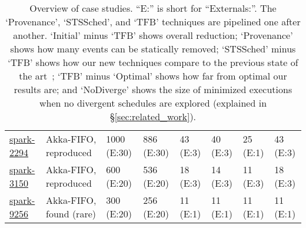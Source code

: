 \begin{table*}
{\begin{tabular}{|l|l|l|l|l|l||l||l|}
\href{https://docs.google.com/document/d/1JQiaLlm6XwLCWKOBOFkaMzg8Gd7NT5gDH3_8OV-oekY}{spark-2294}
& Akka-FIFO, reproduced
& 1000 \hfill (E:30) & 886 \hfill (E:30) & 43 \hfill (E:3) & 40 \hfill (E:3) &
25 \hfill (E:1) & 43 \hfill (E:3) \\


\href{https://docs.google.com/document/d/1mWbxS2-B0v4fbY_FIASs6HCmAXFh6K89DMYX-XEmeL8}{spark-3150}
& Akka-FIFO, reproduced
& 600 \hfill (E:20) & 536 \hfill (E:20) & 18 \hfill (E:3) & 14 \hfill (E:3) &
11 \hfill (E:3) & 18 \hfill (E:3) \\

\href{https://docs.google.com/document/d/1rPseAbo3FELT8Fj2lrRUMkrDmjLPYI26Jgr8goAMLzU}{spark-9256}
& Akka-FIFO, found (rare)
& 300 \hfill (E:20) & 256 \hfill (E:20) & 11 \hfill (E:1) & 11 \hfill (E:1) &
11 \hfill (E:1) & 11 \hfill (E:1) \\

\hline
\end{tabular}
\caption{Overview of case studies. ``E:'' is short for ``Externals:''. The
`Provenance', `STSSched', and `TFB' techniques are pipelined one after another.
`Initial' minus `TFB' shows overall reduction; `Provenance' shows how many events can be statically
removed; `STSSched' minus `TFB' shows how our new techniques
compare to the previous state of the art~\cite{sts2014};
 `TFB' minus `Optimal' shows how far from optimal our results are; and
`NoDiverge' shows the size of minimized executions when no divergent schedules are explored (explained
in \S\ref{sec:related_work}).}
\label{dtab:case_studies}
}
\end{table*}

